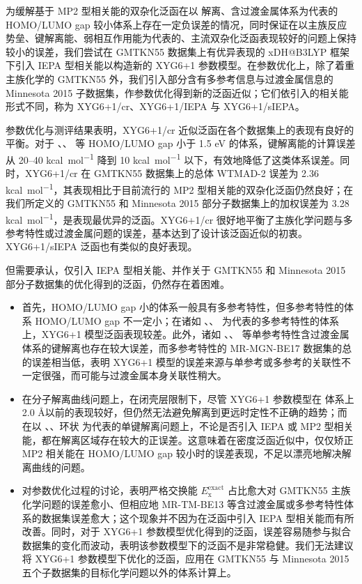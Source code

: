 为缓解基于 MP2 型相关能的双杂化泛函在以  解离、含过渡金属体系为代表的 HOMO/LUMO gap 较小体系上存在一定负误差的情况，同时保证在以主族反应势垒、键解离能、弱相互作用能为代表的、主流双杂化泛函表现较好的问题上保持较小的误差，我们尝试在 GMTKN55 数据集上有优异表现的 xDH@B3LYP 框架下引入 IEPA 型相关能以构造新的 XYG6+1 参数模型。在参数优化上，除了着重主族化学的 GMTKN55 外，我们引入部分含有多参考信息与过渡金属信息的 Minnesota 2015 子数据集，作参数优化得到新的泛函近似；它们依引入的相关能形式不同，称为 XYG6+1/cr、XYG6+1/IEPA 与 XYG6+1/sIEPA。

参数优化与测评结果表明，XYG6+1/cr 近似泛函在各个数据集上的表现有良好的平衡。对于 、、 等 HOMO/LUMO gap 小于 1.5 eV 的体系，键解离能的计算误差从 20--40 \si{kcal.mol^{-1}} 降到 10 \si{kcal.mol^{-1}} 以下，有效地降低了这类体系误差。同时，XYG6+1/cr 在 GMTKN55 数据集上的总体 WTMAD-2 误差为 2.36 \si{kcal.mol^{-1}}，其表现相比于目前流行的 MP2 型相关能的双杂化泛函仍然良好；在我们所定义的 GMTKN55 和 Minnesota 2015 部分子数据集上的加权误差为 3.28 \si{kcal.mol^{-1}}，是表现最优异的泛函。XYG6+1/cr 很好地平衡了主族化学问题与多参考特性或过渡金属问题的误差，基本达到了设计该泛函近似的初衷。XYG6+1/sIEPA 泛函也有类似的良好表现。

但需要承认，仅引入 IEPA 型相关能、并作关于 GMTKN55 和 Minnesota 2015 部分子数据集的优化得到的泛函，仍然存在着困难。
\begin{itemize}[nosep]
  \item 首先，HOMO/LUMO gap 小的体系一般具有多参考特性，但多参考特性的体系 HOMO/LUMO gap 不一定小；在诸如 、、 为代表的多参考特性的体系上，XYG6+1 模型泛函表现较差。此外，诸如 、、 等单参考特性含过渡金属体系的键解离也存在较大误差，而多参考特性的 MR-MGN-BE17 数据集的总的误差相当低，表明 XYG6+1 模型的误差来源与单参考或多参考的关联性不一定很强，而可能与过渡金属本身关联性稍大。
  \item 在分子解离曲线问题上，在闭壳层限制下，尽管 XYG6+1 参数模型在  体系上 2.0 \AA 以前的表现较好，但仍然无法避免解离到更远时定性不正确的趋势；而在以 、、环状  为代表的单键解离问题上，不论是否引入 IEPA 或 MP2 型相关能，都在解离区域存在较大的正误差。这意味着在密度泛函近似中，仅仅矫正 MP2 相关能在 HOMO/LUMO gap 较小时的误差表现，不足以漂亮地解决解离曲线的问题。
  \item 对参数优化过程的讨论，表明严格交换能 $E_\mathrm{x}^\mathrm{exact}$ 占比愈大对 GMTKN55 主族化学问题的误差愈小、但相应地 MR-TM-BE13 等含过渡金属或多参考特性体系的数据集误差愈大；这个现象并不因为在泛函中引入 IEPA 型相关能而有所改善。同时，对于 XYG6+1 参数模型优化得到的泛函，误差容易随参与拟合数据集的变化而波动，表明该参数模型下的泛函不是非常稳健。我们无法建议将 XYG6+1 参数模型下优化的泛函，应用在 GMTKN55 与 Minnesota 2015 五个子数据集的目标化学问题以外的体系计算上。
\end{itemize}

